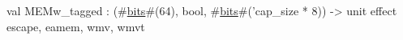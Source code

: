 val MEMw_tagged : (#\hyperref[zbits]{bits}#(64), bool, #\hyperref[zbits]{bits}#('cap_size * 8)) -> unit effect { escape, eamem, wmv, wmvt }
